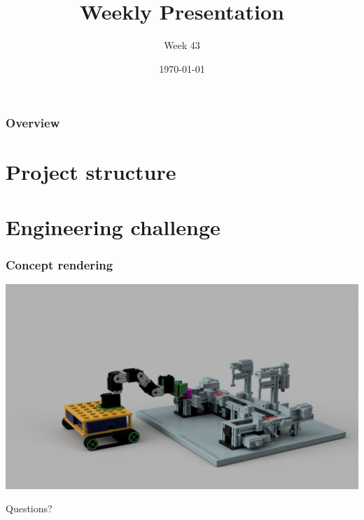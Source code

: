 \documentclass{beamer}
\title{Weekly Presentation}
\subtitle{Week 43}
\author{}
\institute{Luleå University of Technology}
\date{\today}
\begin{document}
\begin{frame}
    \titlepage
\end{frame}

\begin{frame}
    \frametitle{Overview}
    \tableofcontents
\end{frame}


\section{Project structure}



\section{Engineering challenge}






\begin{frame}
    \frametitle{Concept rendering}
    \includegraphics[width=\textwidth]{frames/img/b4_manufacturing.PNG}
\end{frame}










\begin{frame}
    \begin{center}
        \Huge Questions?
    \end{center}
\end{frame}
\end{document}
